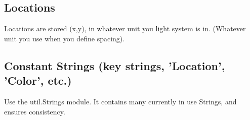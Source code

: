 \documentclass{article}
\begin{document}
        \subsection{Locations}
            Locations are stored (x,y), in whatever unit you light system is
            in.  (Whatever unit you use when you define spacing).
        \subsection{Constant Strings (key strings, 'Location', 'Color', etc.)}
            Use the util.Strings module.  It contains many currently in use
            Strings, and ensures consistency. 
    
\end{document}
